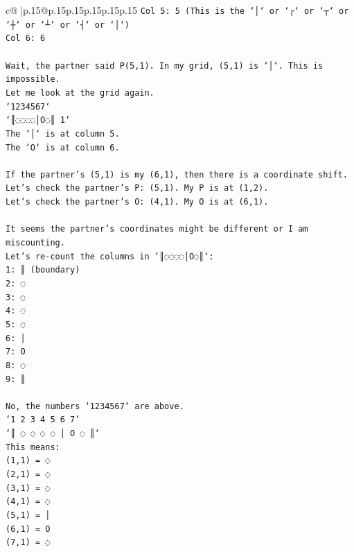 \documentclass{article}
\begin{document}
{\begin{supertabular}{c@{$\;$}|p{.15\linewidth}@{}p{.15\linewidth}p{.15\linewidth}p{.15\linewidth}p{.15\linewidth}p{.15\linewidth}}
{{{\texttt{Col 5: 5 (This is the `│` or `┌` or `┬` or `┼` or `┴` or `┤` or `│`)} \\
\texttt{Col 6: 6} \\
\\ 
\texttt{Wait, the partner said P(5,1). In my grid, (5,1) is `│`. This is impossible.} \\
\texttt{Let me look at the grid again.} \\
\texttt{`1234567`} \\
\texttt{`║◌◌◌◌│O◌║ 1`} \\
\texttt{The `│` is at column 5.} \\
\texttt{The `O` is at column 6.} \\
\\ 
\texttt{If the partner's (5,1) is my (6,1), then there is a coordinate shift.} \\
\texttt{Let's check the partner's P: (5,1). My P is at (1,2).} \\
\texttt{Let's check the partner's O: (4,1). My O is at (6,1).} \\
\\ 
\texttt{It seems the partner's coordinates might be different or I am miscounting.} \\
\texttt{Let's re{-}count the columns in `║◌◌◌◌│O◌║`:} \\
\texttt{1: ║ (boundary)} \\
\texttt{2: ◌} \\
\texttt{3: ◌} \\
\texttt{4: ◌} \\
\texttt{5: ◌} \\
\texttt{6: │} \\
\texttt{7: O} \\
\texttt{8: ◌} \\
\texttt{9: ║} \\
\\ 
\texttt{No, the numbers `1234567` are above.} \\
\texttt{`1 2 3 4 5 6 7`} \\
\texttt{`║ ◌ ◌ ◌ ◌ │ O ◌ ║`} \\
\texttt{This means:} \\
\texttt{(1,1) = ◌} \\
\texttt{(2,1) = ◌} \\
\texttt{(3,1) = ◌} \\
\texttt{(4,1) = ◌} \\
\texttt{(5,1) = │} \\
\texttt{(6,1) = O} \\
\texttt{(7,1) = ◌} \\
}}}
\end{supertabular}}
\end{document}
